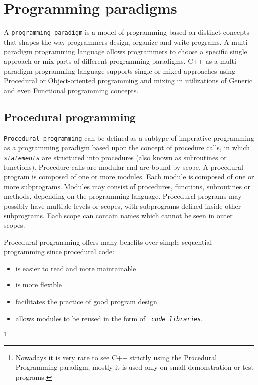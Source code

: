 \section{Programming paradigms}
A \texttt{programming paradigm} is a model of programming based on distinct
concepts that shapes the way programmers design, organize and write programs.
A multi-paradigm programming language allows programmers to choose a specific
single approach or mix parts of different programming paradigms. C++ as a
multi-paradigm programming language supports single or mixed approaches using
Procedural or Object-oriented programming and mixing in utilizations of Generic
and even Functional programming concepts.

\subsection{Procedural programming}
\texttt{Procedural programming} can be defined as a subtype of 
imperative programming as a programming paradigm based upon the
concept of procedure calls, in which  \texttt{ \textit{statements}} are
structured into procedures (also known as subroutines or functions). Procedure
calls are modular and are bound by scope. A procedural program is composed of
one or more modules. Each module is composed of one or more subprograms.
Modules may consist of procedures, functions, subroutines or methods, depending
on the programming language. Procedural programs may possibly have multiple
levels or scopes, with subprograms defined inside other subprograms. Each scope
can contain names which cannot be seen in outer scopes.

Procedural programming offers many benefits over simple sequential programming since procedural code:
\begin{itemize}
\item is easier to read and more maintainable
\item is more flexible
\item facilitates the practice of good program design
\item allows modules to be reused in the form of  \texttt{ \textit{code libraries}}.
\end{itemize}

 \footnote{Nowadays it is very rare to see C++ strictly using the Procedural
 Programming paradigm, mostly it is used only on small demonstration or test
 programs.}

